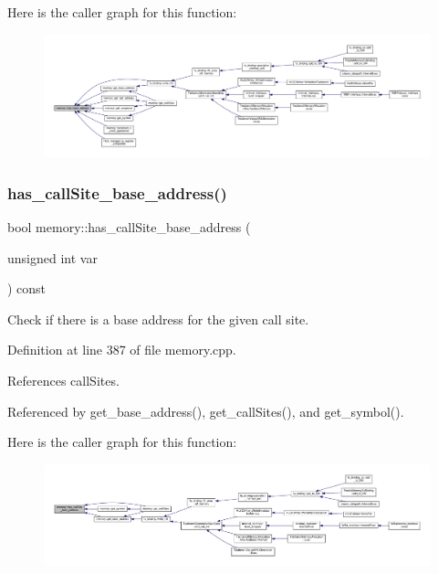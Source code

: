 Here is the caller graph for this function\+:
\nopagebreak
\begin{figure}[H]
\begin{center}
\leavevmode
\includegraphics[width=350pt]{d8/d99/classmemory_a96f4c37de951e186df09a2ddc249d77b_icgraph}
\end{center}
\end{figure}
\mbox{\label{classmemory_a4ded4a834b5c7c70d1f7c83117d4c774}} 
\subsubsection{\texorpdfstring{has\+\_\+call\+Site\+\_\+base\+\_\+address()}{has\_callSite\_base\_address()}}
{\footnotesize\ttfamily bool memory\+::has\+\_\+call\+Site\+\_\+base\+\_\+address (\begin{DoxyParamCaption}\item[{unsigned int}]{var }\end{DoxyParamCaption}) const}



Check if there is a base address for the given call site. 



Definition at line 387 of file memory.\+cpp.



References call\+Sites.



Referenced by get\+\_\+base\+\_\+address(), get\+\_\+call\+Sites(), and get\+\_\+symbol().

Here is the caller graph for this function\+:
\nopagebreak
\begin{figure}[H]
\begin{center}
\leavevmode
\includegraphics[width=350pt]{d8/d99/classmemory_a4ded4a834b5c7c70d1f7c83117d4c774_icgraph}
\end{center}
\end{figure}
\mbox{\label{classmemory_a25b6c76946f47b674ad6d63efc48fd4d}} 
